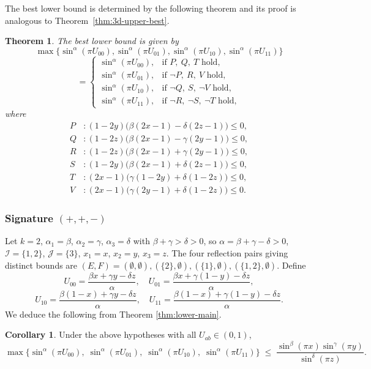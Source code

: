 \documentclass[12pt]{amsart}
\newtheorem{theorem}{Theorem}[section]
\theoremstyle{definition}
\newtheorem{corollary}{Corollary}[section]
\begin{document}
The best lower bound is determined by the following theorem and its proof is analogous to Theorem~\ref{thm:3d-upper-best}.

\begin{theorem}\label{thm:3d-lower-mminus-best}
The best lower bound is given by
\[
\max\{\sin^{\alpha}(\pi U_{00}), \sin^{\alpha}(\pi U_{01}), \sin^{\alpha}(\pi U_{10}), \sin^{\alpha}(\pi U_{11})\}
\]
\[
=
\begin{cases}
\sin^{\alpha}(\pi U_{00}), & \text{if } P,\ Q,\ T \text{ hold},\\
\sin^{\alpha}(\pi U_{01}), & \text{if } \neg P,\ R,\ V \text{ hold},\\
\sin^{\alpha}(\pi U_{10}), & \text{if } \neg Q,\ S,\ \neg V \text{ hold},\\
\sin^{\alpha}(\pi U_{11}), & \text{if } \neg R,\ \neg S,\ \neg T \text{ hold},
\end{cases}
\]
where
\begin{align*}
P &: (1-2y)\bigl(\beta(2x-1) - \delta(2z-1)\bigr) \le 0, \\
Q &: (1-2z)\bigl(\beta(2x-1) - \gamma(2y-1)\bigr) \le 0, \\
R &: (1-2z)\bigl(\beta(2x-1) + \gamma(2y-1)\bigr) \le 0, \\
S &: (1-2y)\bigl(\beta(2x-1) + \delta(2z-1)\bigr) \le 0, \\
T &: (2x-1)\bigl(\gamma(1-2y) + \delta(1-2z)\bigr) \le 0, \\
V &: (2x-1)\bigl(\gamma(2y-1) + \delta(1-2z)\bigr) \le 0.
\end{align*}
\end{theorem}

\subsubsection{Signature $(+,+,-)$}

Let $k=2$, $\alpha_1=\beta$, $\alpha_2=\gamma$, $\alpha_3=\delta$ with $\beta+\gamma>\delta>0$, so $\alpha = \beta + \gamma - \delta > 0$, $\mathcal I=\{1,2\}$, $\mathcal J=\{3\}$, $x_1=x$, $x_2=y$, $x_3=z$. The four reflection pairs giving distinct bounds are $(E,F)=(\emptyset,\emptyset),(\{2\},\emptyset),(\{1\},\emptyset),(\{1,2\},\emptyset)$. Define
\[
U_{00} = \frac{\beta x + \gamma y - \delta z}{\alpha},\quad
U_{01} = \frac{\beta x + \gamma(1-y) - \delta z}{\alpha},
\]
\[
U_{10} = \frac{\beta(1-x) + \gamma y - \delta z}{\alpha},\quad
U_{11} = \frac{\beta(1-x) + \gamma(1-y) - \delta z}{\alpha}.
\]
We deduce the following from Theorem \ref{thm:lower-main}.
\begin{corollary}\label{cor:3d-lower-ppminus}
Under the above hypotheses with all $U_{ab} \in (0,1)$,
\[
\max\bigl\{
  \sin^{\alpha}(\pi U_{00}),\;
  \sin^{\alpha}(\pi U_{01}),\;
  \sin^{\alpha}(\pi U_{10}),\;
  \sin^{\alpha}(\pi U_{11})
\bigr\}
\;\leq\; \frac{\sin^\beta(\pi x)\sin^\gamma(\pi y)}{\sin^\delta(\pi z)}.
\]
\end{corollary}
\end{document}
